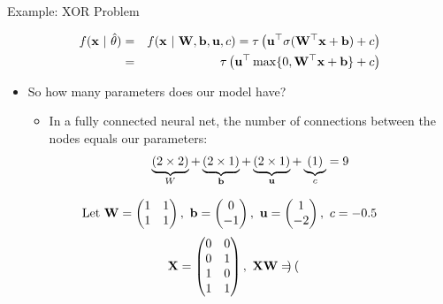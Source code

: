 \documentclass[11pt,compress,t,notes=noshow, xcolor=table]{beamer}
\begin{document}
\begin{vbframe}{Example: XOR Problem}
\begin{itemize}
  \end{itemize}
  \begin{eqnarray*}
    f(\mathbf{x}~|~\hat{\theta}) &=& f(\mathbf{x}~|~ \mathbf{W}, \mathbf{b}, \mathbf{u}, c) = \tau\left(\mathbf{u}^\top\sigma(\mathbf{W}^\top \mathbf{x}+\mathbf{b})+c\right) \\
                &=& \tau\left(\mathbf{u}^\top \max\{0, \mathbf{W}^\top \mathbf{x}+\mathbf{b}\} + c\right)
  \end{eqnarray*}
  \begin{itemize}
    \item So how many parameters does our model have?
    \begin{itemize}
      \item In a fully connected neural net, the number of connections between the nodes equals our parameters: $$\underbrace{(2 \times 2)}_{W} + \underbrace{(2 \times 1)}_{\mathbf{b}} + \underbrace{(2 \times 1)}_{\mathbf{u}} + \underbrace{(1)}_{c} = 9$$
    \end{itemize}
  \end{itemize}
\framebreak
  \begin{eqnarray*}
   \text{Let} \ \mathbf{W} = \begin{pmatrix}
      1 & 1 \\
      1 & 1
    \end{pmatrix}, \
      \mathbf{b} = \begin{pmatrix}
      0 \\
      -1
    \end{pmatrix}, \
      \mathbf{u} = \begin{pmatrix}
      1 \\
      -2
    \end{pmatrix}, \
      c = - 0.5
  \end{eqnarray*}
  \begin{eqnarray*}
    \mathbf{X} = \begin{pmatrix}
      0 & 0 \\
      0 & 1 \\
      1 & 0 \\
      1 & 1
    \end{pmatrix}, \
    \mathbf{X} \mathbf{W} = \begin{pmatrix}

\end{pmatrix}
\end{eqnarray*}
\end{vbframe}
\end{document}
